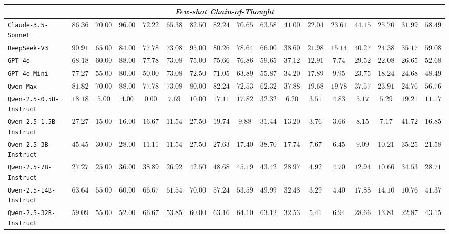 \begin{table*}[]
{\begin{tabular}{lcccccccccccccccc}
\midrule
\multicolumn{17}{c}{\textit{Few-shot Chain-of-Thought}}                                                                        \\ \midrule
\texttt{Claude-3.5-Sonnet} & $86.36$ & $70.00$ & $96.00$ & $72.22$ & $65.38$ & $82.50$ & $82.24$ & $70.65$ & $63.58$ & $41.00$ & $22.04$ & $23.61$ & $44.15$ & $25.70$ & $31.99$ & $58.49$ \\
\texttt{DeepSeek-V3} & $90.91$ & $65.00$ & $84.00$ & $77.78$ & $73.08$ & $95.00$ & $80.26$ & $78.64$ & $66.00$ & $38.60$ & $21.98$ & $15.14$ & $40.27$ & $24.38$ & $35.17$ & $59.08$ \\
\texttt{GPT-4o} & $68.18$ & $60.00$ & $88.00$ & $77.78$ & $73.08$ & $75.00$ & $75.66$ & $76.86$ & $59.65$ & $37.12$ & $12.91$ & $7.74$ & $29.52$ & $22.08$ & $26.65$ & $52.68$ \\
\texttt{GPT-4o-Mini} & $77.27$ & $55.00$ & $80.00$ & $50.00$ & $73.08$ & $72.50$ & $71.05$ & $63.89$ & $55.87$ & $34.20$ & $17.89$ & $9.95$ & $23.75$ & $18.24$ & $24.68$ & $48.49$ \\
\texttt{Qwen-Max} & $81.82$ & $70.00$ & $88.00$ & $77.78$ & $73.08$ & $80.00$ & $82.24$ & $72.53$ & $62.32$ & $37.88$ & $19.68$ & $19.78$ & $37.57$ & $23.91$ & $24.76$ & $56.76$ \\
\texttt{Qwen-2.5-0.5B-Instruct} & $18.18$ & $5.00$ & $4.00$ & $0.00$ & $7.69$ & $10.00$ & $17.11$ & $17.82$ & $32.32$ & $6.20$ & $3.51$ & $4.83$ & $5.17$ & $5.29$ & $19.21$ & $11.17$ \\
\texttt{Qwen-2.5-1.5B-Instruct} & $27.27$ & $15.00$ & $16.00$ & $16.67$ & $11.54$ & $27.50$ & $19.74$ & $9.88$ & $31.44$ & $13.20$ & $3.76$ & $3.66$ & $8.15$ & $7.17$ & $41.72$ & $16.85$ \\
\texttt{Qwen-2.5-3B-Instruct} & $45.45$ & $30.00$ & $28.00$ & $11.11$ & $11.54$ & $27.50$ & $27.63$ & $17.40$ & $38.70$ & $17.74$ & $7.67$ & $6.45$ & $9.09$ & $10.21$ & $35.25$ & $21.58$ \\
\texttt{Qwen-2.5-7B-Instruct} & $27.27$ & $25.00$ & $36.00$ & $38.89$ & $26.92$ & $42.50$ & $48.68$ & $45.19$ & $43.42$ & $28.97$ & $4.92$ & $4.70$ & $12.94$ & $10.66$ & $34.53$ & $28.71$ \\
\texttt{Qwen-2.5-14B-Instruct} & $63.64$ & $55.00$ & $60.00$ & $66.67$ & $61.54$ & $70.00$ & $57.24$ & $53.59$ & $49.99$ & $32.48$ & $3.29$ & $4.40$ & $17.88$ & $14.10$ & $10.76$ & $41.37$ \\
\texttt{Qwen-2.5-32B-Instruct} & $59.09$ & $55.00$ & $52.00$ & $66.67$ & $53.85$ & $60.00$ & $63.16$ & $64.10$ & $63.12$ & $32.53$ & $5.41$ & $6.94$ & $28.66$ & $13.81$ & $22.87$ & $43.15$ \\

\end{tabular}}
\end{table*}
